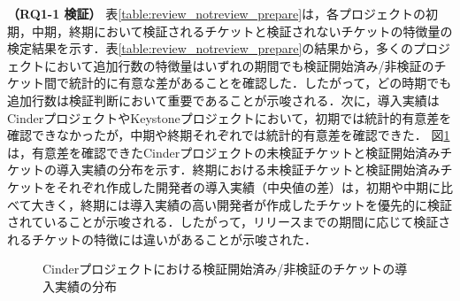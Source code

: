 \documentclass[T,J]{fose} %
\begin{document}
\textbf{（RQ1-1 検証）} 表\ref{table:review_notreview_prepare}は，各プロジェクトの初期，中期，終期において検証されるチケットと検証されないチケットの特徴量の検定結果を示す．表\ref{table:review_notreview_prepare}の結果から，多くのプロジェクトにおいて追加行数の特徴量はいずれの期間でも検証開始済み/非検証のチケット間で統計的に有意な差があることを確認した．したがって，どの時期でも追加行数は検証判断において重要であることが示唆される．次に，導入実績はCinderプロジェクトやKeystoneプロジェクトにおいて，初期では統計的有意差を確認できなかったが，中期や終期それぞれでは統計的有意差を確認できた．
図\ref{fig:review_notreview}は，有意差を確認できたCinderプロジェクトの未検証チケットと検証開始済みチケットの導入実績の分布を示す．終期における未検証チケットと検証開始済みチケットをそれぞれ作成した開発者の導入実績（中央値の差）は，初期や中期に比べて大きく，終期には導入実績の高い開発者が作成したチケットを優先的に検証されていることが示唆される．したがって，リリースまでの期間に応じて検証されるチケットの特徴には違いがあることが示唆された．


\begin{figure}[t]
\begin{center}
\caption{Cinderプロジェクトにおける検証開始済み/非検証のチケットの導入実績の分布}
\label{fig:review_notreview}
\end{center}
\end{figure}
\end{document}
